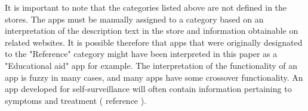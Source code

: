 It is important to note that the categories listed above are not defined in the stores. The apps must be manually assigned to a category based on an interpretation of the description text in the store and information obtainable on related websites. It is possible therefore that apps that were originally designated to the "Reference" category might have been interpreted in this paper as a "Educational aid" app for example. The interpretation of the functionality of an app is fuzzy in many cases, and many apps have some crossover functionality. An app developed for self-surveillance will often contain information pertaining to symptoms and treatment ( reference ). 